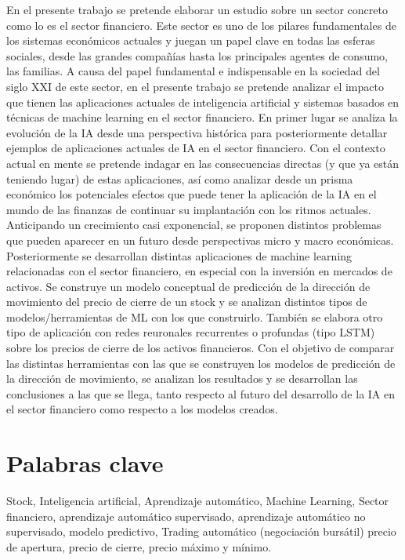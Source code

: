 \documentclass[]{DissertateUSU}
\begin{document}
En el presente trabajo se pretende elaborar un estudio sobre un sector
concreto como lo es el sector financiero. Este sector es uno de los
pilares fundamentales de los sistemas económicos actuales y juegan un
papel clave en todas las esferas sociales, desde las grandes compañías
hasta los principales agentes de consumo, las familias. A causa del
papel fundamental e indispensable en la sociedad del siglo XXI de este
sector, en el presente trabajo se pretende analizar el impacto que
tienen las aplicaciones actuales de inteligencia artificial y sistemas
basados en técnicas de machine learning en el sector financiero. En
primer lugar se analiza la evolución de la IA desde una perspectiva
histórica para posteriormente detallar ejemplos de aplicaciones actuales
de IA en el sector financiero. Con el contexto actual en mente se
pretende indagar en las consecuencias directas (y que ya están teniendo
lugar) de estas aplicaciones, así como analizar desde un prisma
económico los potenciales efectos que puede tener la aplicación de la IA
en el mundo de las finanzas de continuar su implantación con los ritmos
actuales. Anticipando un crecimiento casi exponencial, se proponen
distintos problemas que pueden aparecer en un futuro desde perspectivas
micro y macro económicas. Posteriormente se desarrollan distintas
aplicaciones de machine learning relacionadas con el sector financiero,
en especial con la inversión en mercados de activos. Se construye un
modelo conceptual de predicción de la dirección de movimiento del precio
de cierre de un stock y se analizan distintos tipos de
modelos/herramientas de ML con los que construirlo. También se elabora
otro tipo de aplicación con redes reuronales recurrentes o profundas
(tipo LSTM) sobre los precios de cierre de los activos financieros. Con
el objetivo de comparar las distintas herramientas con las que se
construyen los modelos de predicción de la dirección de movimiento, se
analizan los resultados y se desarrollan las conclusiones a las que se
llega, tanto respecto al futuro del desarrollo de la IA en el sector
financiero como respecto a los modelos creados.

\newpage
{}
\fancyhead[R]{\thepage}
\fancyfoot[C]{}

\chapter*{\textbf{Palabras clave}}

Stock, Inteligencia artificial, Aprendizaje automático, Machine
Learning, Sector financiero, aprendizaje automático supervisado,
aprendizaje automático no supervisado, modelo predictivo, Trading
automático (negociación bursátil) precio de apertura, precio de cierre,
precio máximo y mínimo.
\end{document}
